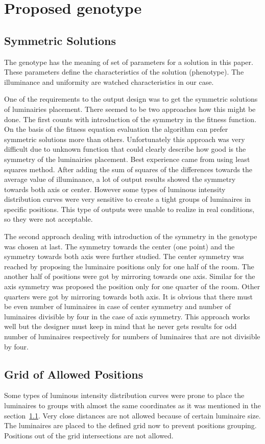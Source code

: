 \section{Proposed genotype}
\subsection{Symmetric Solutions}
\label{ssec:symmetry}
The genotype has the meaning of set of parameters for a solution in this paper. These parameters define the characteristics of the solution (phenotype). The illuminance and uniformity are watched characteristics in our case.

One of the requirements to the output design was to get the symmetric solutions of luminairies placement. There seemed to be two approaches how this might be done. The first counts with introduction of the symmetry in the fitness function. On the basis of the fitness equation evaluation the algorithm can prefer symmetric solutions more than others. Unfortunately this approach was very difficult due to unknown function that could clearly describe how good is the symmetry of the luminairies placement. Best experience came from using least squares method. After adding the sum of squares of the differences towards the average value of illuminance, a lot of output results showed the symmetry towards both axis or center. However some types of luminous intensity distribution curves were very sensitive to create a tight groups of luminaires in specific positions. This type of outputs were unable to realize in real conditions, so they were not acceptable.

The second approach dealing with introduction of the symmetry in the genotype was chosen at last. The symmetry towards the center (one point) and the symmetry towards both axis were further studied. The center symmetry was reached by proposing the luminaire positions only for one half of the room. The another half of positions were got by mirroring towards one axis. Similar for the axis symmetry was proposed the position only for one quarter of the room. Other quarters were got by mirroring towards both axis. It is obvious that there must be even number of luminaires in case of center symmetry and number of luminaires divisible by four in the case of axis symmetry. This approach works well but the designer must keep in mind that he never gets results for odd number of luminaires respectively for numbers of luminaires that are not divisible by four.

\subsection{Grid of Allowed Positions}
\label{ssec:grid}
Some types of luminous intensity distribution curves were prone to place the luminaires to groups with almost the same coordinates as it was mentioned in the section~\ref{ssec:symmetry}. Very close distances are not allowed because of certain luminaire size. The luminaires are placed to the defined grid now to prevent positions grouping. Positions out of the grid intersections are not allowed.

